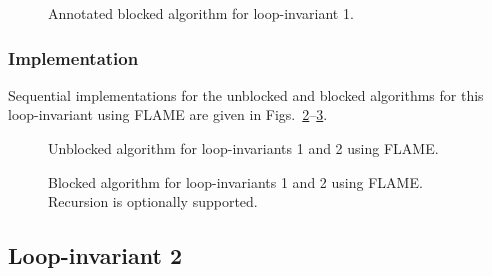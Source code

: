 \renewcommand{\afterupdate}{
\FlaTwoByOne{ 
B_0
}
{
\FlaTwoByOneSingleLine{ B_1 }{ B_2 }
} =
\FlaTwoByOne{ 
\hat{B}_0
}
{
\FlaTwoByOneSingleLine{ L_{11} \hat{B}_1 }{ L_{21} \hat{B}_1 + L_{22} \hat{B}_2 }
}
\wedge \ldots
}

\renewcommand{\update}{
\begin{minipage}[t]{4in}
\noindent
$ B_2 \becomes L_{21} B_1 + B_2 $\\
$ B_1 \becomes L_{11} B_1 $\\
\end{minipage}
}

\begin{figure}[htbp]
\worksheet
\caption{Annotated blocked algorithm for loop-invariant 1.}
\label{fig:ws:ltrmm_lln_blk}
\end{figure}
%

\subsubsection{Implementation}

Sequential implementations for the unblocked and blocked algorithms
for this loop-invariant using FLAME are given in
Figs.~\ref{fig:syrk_un_lazy_unb}--\ref{fig:syrk_un_lazy_blk}.

\begin{figure}[htbp]
\footnotesize
\begin{quote}
\end{quote}
\caption{Unblocked algorithm for loop-invariants 1 and 2 using FLAME.}
\label{fig:syrk_un_lazy_unb}
\end{figure}

\begin{figure}[htbp]
\footnotesize
{}%
\begin{quote}
\end{quote}
\caption{Blocked algorithm for loop-invariants 1 and 2 using FLAME.
Recursion is optionally supported.}
\label{fig:syrk_un_lazy_blk}
\end{figure}

\subsection{Loop-invariant 2}

